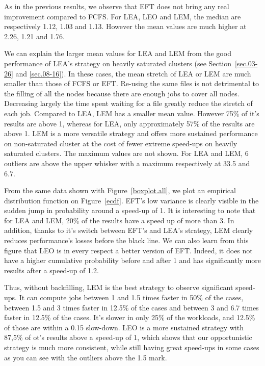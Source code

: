 \documentclass[conference,10pt]{IEEEtran}
\begin{document}
As in the previous results, we observe that EFT does not bring any real improvement compared to FCFS.
For LEA, LEO and LEM, the median are respectively 1.12, 1.03 and 1.13. 
However the mean values are much higher at 2.26, 1.21 and 1.76.

We can explain the larger mean values for LEA and LEM from the good performance of LEA's strategy
on heavily saturated clusters (see Section~\ref{sec.03-26} and \ref{sec.08-16}).
In these cases, the mean stretch of LEA or LEM are much smaller than those of FCFS or EFT.
Re-using the same files is not detrimental to the filling of all the nodes because there are 
enough jobs to cover all nodes.
Decreasing largely the time spent waiting for a file greatly reduce the stretch of each job.
Compared to LEA, LEM has a smaller mean value.
However 75\% of it's results are above 1, whereas for LEA, only approximately 57\% of the results are above 1. 
LEM is a more versatile strategy and offers more sustained performance on non-saturated cluster at the cost
of fewer extreme speed-ups on heavily saturated clusters.
The maximum values are not shown. For LEA and LEM, 6 outliers are above the upper whisker with 
a maximum respectively at 33.5 and 6.7.

From the same data shown with Figure~\ref{boxplot.all}, we plot an empirical distribution function on Figure~\ref{ecdf}.
EFT's low variance is clearly visible in the sudden jump in probability around a speed-up of 1.
It is interesting to note that for LEA and LEM, 20\% of the results have a speed up of more than 3.
In addition, thanks to it's switch between EFT's and LEA's strategy, LEM clearly reduces
performance's losses before the black line.
We can also learn from this figure that LEO is in every respect a better version of EFT.
Indeed, it does not have a higher cumulative probability before and after 1 and has significantly more
results after a speed-up of 1.2.

Thus, without backfilling, LEM is the best strategy to observe significant speed-ups.
It can compute jobs between 1 and 1.5 times faster in 50\% of the cases,
between 1.5 and 3 times faster in 12.5\% of the cases and between 3 and 6.7 times faster in 12.5\% of the cases.
It's slower in only 25\% of the workloads, and 12.5\% of those are within a 0.15 slow-down.
LEO is a more sustained strategy with 87,5\% of ot's results above a speed-up of 1, which shows that our opportunistic
strategy is much more consistent, while still having great speed-ups in some cases as you can 
see with the outliers above the 1.5 mark.
\end{document}
